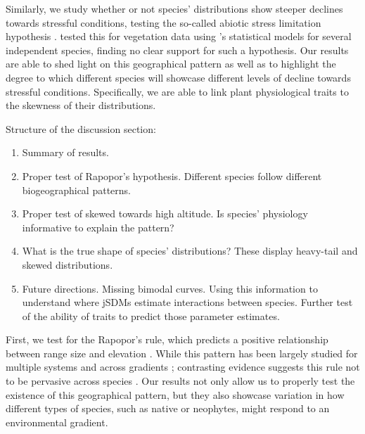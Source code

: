 \documentclass[11pt, a4paper]{article}
\begin{document}
Similarly, we study whether or not species' distributions show steeper declines towards stressful conditions, testing the so-called abiotic stress limitation hypothesis \citep{Loutlain 2015 TREE}. \citet{normandImportanceAbioticStress2009} tested this for vegetation data using \citeauthor{huismanHierarchicalSetModels1993}'s statistical models for several independent species, finding no clear support for such a hypothesis. Our results are able to shed light on this geographical pattern as well as to highlight the degree to which different species will showcase different levels of decline towards stressful conditions. Specifically, we are able to link plant physiological traits to the skewness of their distributions.

Structure of the discussion section:
\begin{enumerate}
\item Summary of results.
\item Proper test of Rapopor's hypothesis. Different species follow different biogeographical patterns.
\item Proper test of skewed towards high altitude. Is species' physiology informative to explain the pattern? 
\item What is the true shape of species' distributions? These display heavy-tail and skewed distributions. 
\item Future directions. Missing bimodal curves. Using this information to understand where jSDMs estimate interactions between species. Further test of the ability of traits to predict those parameter estimates.
\end{enumerate}
% 

First, we test for the Rapopor's rule, which predicts a positive relationship between range size and elevation \citep{stevensElevationalGradientAltitudinal1992}. While this pattern has been largely studied for multiple systems and across gradients \citep{mccainElevationalRapoportRule2013}; contrasting evidence suggests this rule not to be pervasive across species \citep{ribasRapoportEffectWidespread2006, bhattaraiCanRapoportRule2006, mccainElevationalRapoportRule2013}. Our results not only allow us to properly test the existence of this geographical pattern, but they also showcase variation in how different types of species, such as native or neophytes, might respond to an environmental gradient.
\end{document}
